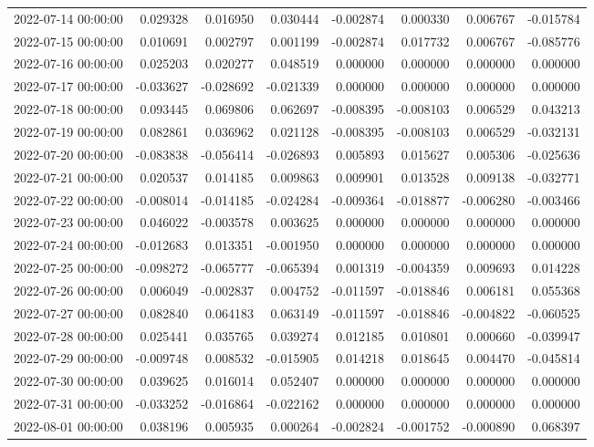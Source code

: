 \begin{tabular}{lrrrrrrr}
2022-07-14 00:00:00 & 0.029328 & 0.016950 & 0.030444 & -0.002874 & 0.000330 & 0.006767 & -0.015784 \\
2022-07-15 00:00:00 & 0.010691 & 0.002797 & 0.001199 & -0.002874 & 0.017732 & 0.006767 & -0.085776 \\
2022-07-16 00:00:00 & 0.025203 & 0.020277 & 0.048519 & 0.000000 & 0.000000 & 0.000000 & 0.000000 \\
2022-07-17 00:00:00 & -0.033627 & -0.028692 & -0.021339 & 0.000000 & 0.000000 & 0.000000 & 0.000000 \\
2022-07-18 00:00:00 & 0.093445 & 0.069806 & 0.062697 & -0.008395 & -0.008103 & 0.006529 & 0.043213 \\
2022-07-19 00:00:00 & 0.082861 & 0.036962 & 0.021128 & -0.008395 & -0.008103 & 0.006529 & -0.032131 \\
2022-07-20 00:00:00 & -0.083838 & -0.056414 & -0.026893 & 0.005893 & 0.015627 & 0.005306 & -0.025636 \\
2022-07-21 00:00:00 & 0.020537 & 0.014185 & 0.009863 & 0.009901 & 0.013528 & 0.009138 & -0.032771 \\
2022-07-22 00:00:00 & -0.008014 & -0.014185 & -0.024284 & -0.009364 & -0.018877 & -0.006280 & -0.003466 \\
2022-07-23 00:00:00 & 0.046022 & -0.003578 & 0.003625 & 0.000000 & 0.000000 & 0.000000 & 0.000000 \\
2022-07-24 00:00:00 & -0.012683 & 0.013351 & -0.001950 & 0.000000 & 0.000000 & 0.000000 & 0.000000 \\
2022-07-25 00:00:00 & -0.098272 & -0.065777 & -0.065394 & 0.001319 & -0.004359 & 0.009693 & 0.014228 \\
2022-07-26 00:00:00 & 0.006049 & -0.002837 & 0.004752 & -0.011597 & -0.018846 & 0.006181 & 0.055368 \\
2022-07-27 00:00:00 & 0.082840 & 0.064183 & 0.063149 & -0.011597 & -0.018846 & -0.004822 & -0.060525 \\
2022-07-28 00:00:00 & 0.025441 & 0.035765 & 0.039274 & 0.012185 & 0.010801 & 0.000660 & -0.039947 \\
2022-07-29 00:00:00 & -0.009748 & 0.008532 & -0.015905 & 0.014218 & 0.018645 & 0.004470 & -0.045814 \\
2022-07-30 00:00:00 & 0.039625 & 0.016014 & 0.052407 & 0.000000 & 0.000000 & 0.000000 & 0.000000 \\
2022-07-31 00:00:00 & -0.033252 & -0.016864 & -0.022162 & 0.000000 & 0.000000 & 0.000000 & 0.000000 \\
2022-08-01 00:00:00 & 0.038196 & 0.005935 & 0.000264 & -0.002824 & -0.001752 & -0.000890 & 0.068397 \\

\end{tabular}
